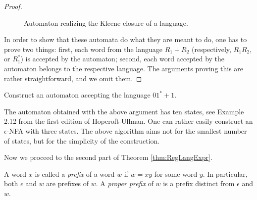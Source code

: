 \begin{page}
\begin{proof}
\begin{figure}[ht]
\begin{center}

\end{center}
\caption{Automaton realizing the Kleene closure of a language.}
\label{fig:AutomClosure}
\end{figure}

In order to show that these automata do what they are meant to do, one has to prove two things:
first, each word from the language $R_1 + R_2$ (respectively, $R_1R_2$, or $R_1^*$) is accepted by the automaton;
second, each word accepted by the automaton belongs to the respective language.
The arguments proving this are rather straightforward, and we omit them.
\end{proof}


\end{page}

\begin{page}
\setcounter{section}{2}
\setcounter{subsection}{2}
\setcounter{dfn}{8}
\label{portion:1097}

\begin{exl}
Construct an automaton accepting the language $01^* + 1$.

The automaton obtained with the above argument has ten states, see Example 2.12 from the first edition of Hopcroft-Ullman.
One can rather easily construct an $\epsilon$-NFA with three states.
The above algorithm aims not for the smallest number of states, but for the simplicity of the construction.
\end{exl}

\end{page}

\begin{page}
\setcounter{section}{2}
\setcounter{subsection}{2}
\setcounter{dfn}{8}
\label{portion:1098}


Now we proceed to the second part of Theorem \ref{thm:RegLangExpr}.


\end{page}

\begin{page}
\setcounter{section}{2}
\setcounter{subsection}{2}
\setcounter{dfn}{9}
\label{portion:1100}

\begin{dfn}
A word $x$ is called a \emph{prefix} of a word $w$ if $w = xy$ for some word $y$.
In particular, both $\epsilon$ and $w$ are prefixes of $w$.
A \emph{proper prefix} of $w$ is a prefix distinct from $\epsilon$ and $w$.
\end{dfn}

\end{page}

